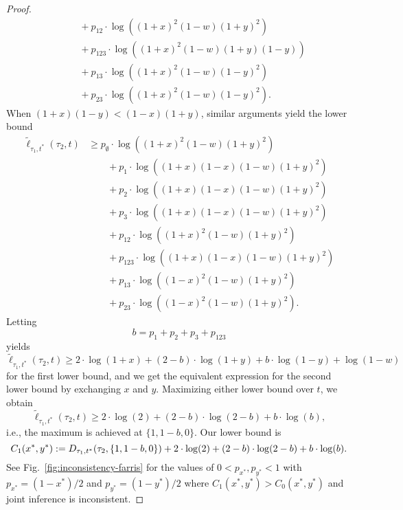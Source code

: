 \begin{proof}
\begin{align*}
    &\qquad + p_{12}         \cdot\log((1+x)^2   (1-w)(1+y)^2) \\
    &\qquad + p_{123}        \cdot\log((1+x)^2   (1-w)(1+y)(1-y))\\
    &\qquad + p_{13}         \cdot\log((1+x)^2   (1-w)(1-y)^2) \\
    &\qquad + p_{23}         \cdot\log((1+x)^2   (1-w)(1-y)^2).
\end{align*}
When $(1+x)(1-y) < (1-x)(1+y)$, similar arguments yield the lower bound
\begin{align*}
    \tilde{\ell}_{\tau_1,t^*}(\tau_2, t)
    &\ge      p_{\emptyset}  \cdot\log((1+x)^2    (1-w)(1+y)^2) \\
    &\qquad + p_{1}          \cdot\log((1+x)(1-x)(1-w)(1+y)^2) \\
    &\qquad + p_{2}          \cdot\log((1+x)(1-x)(1-w)(1+y)^2) \\
    &\qquad + p_{3}          \cdot\log((1+x)(1-x)(1-w)(1+y)^2) \\
    &\qquad + p_{12}         \cdot\log((1+x)^2    (1-w)(1+y)^2) \\
    &\qquad + p_{123}        \cdot\log((1+x)(1-x)(1-w)(1+y)^2)\\
    &\qquad + p_{13}         \cdot\log((1-x)^2    (1-w)(1+y)^2) \\
    &\qquad + p_{23}         \cdot\log((1-x)^2    (1-w)(1+y)^2).
\end{align*}
Letting
\[
b = p_{1}+p_{2}+p_{3}+p_{123}
\]
yields
\[
    \tilde{\ell}_{\tau_1,t^*}(\tau_2, t)
    \ge      2\cdot\log(1+x)
    + (2-b)  \cdot\log(1+y)
    + b      \cdot\log(1-y)
    + \log(1-w)
\]
for the first lower bound, and we get the equivalent expression for the second lower bound by exchanging $x$ and $y$.
Maximizing either lower bound over $t$, we obtain
\[
\tilde{\ell}_{\tau_1,t^*}(\tau_2, t)
\ge      2\cdot\log(2)
+ (2-b)  \cdot\log(2-b)
+ b      \cdot\log(b),
\]
i.e., the maximum is achieved at $\{1,1-b,0\}$.
Our lower bound is
\[
C_1(x^*, y^*) := D_{\tau_1,t^*}(\tau_2,\{1,1-b,0\}) + 2\cdot\log(2) + (2-b)\cdot\log(2-b) + b\cdot\log(b).
\]
See Fig.~\ref{fig:inconsistency-farris} for the values of $0 < p_{x^*}, p_{y^*} < 1$ with $p_{x^*}=(1-x^*)/2$ and $p_{y^*}=(1-y^*)/2$ where $C_1(x^*, y^*) > C_0(x^*, y^*)$ and joint inference is inconsistent.
\end{proof}

\generalBranchInconsist*

